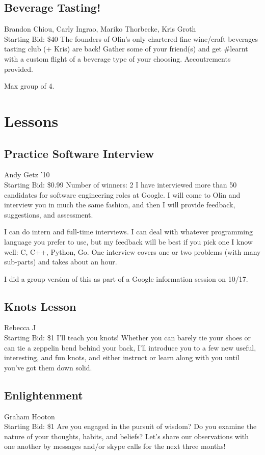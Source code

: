 \documentclass[11pt]{article}
\begin{document}
\subsection{Beverage Tasting!}
Brandon Chiou, Carly Ingrao, Mariko Thorbecke, Kris Groth
\\
Starting Bid: \$40
\newline
The founders of Olin's only chartered fine wine/craft beverages tasting club (+ Kris) are back! Gather some of your friend(s) and get \#learnt with a custom flight of a beverage type of your choosing. Accoutrements provided.

Max group of 4.
\section{Lessons}
\subsection{Practice Software Interview}
Andy Getz '10
\\
Starting Bid: \$0.99
\newline
Number of winners: 2
\newline
I have interviewed more than 50 candidates for software engineering roles at Google.  I will come to Olin and interview you in much the same fashion, and then I will provide feedback, suggestions, and assessment.

I can do intern and full-time interviews.  I can deal with whatever programming language you prefer to use, but my feedback will be best if you pick one I know well: C, C++, Python, Go.  One interview covers one or two problems (with many sub-parts) and takes about an hour.

I did a group version of this as part of a Google information session on 10/17.
\subsection{Knots Lesson}
Rebecca J
\\
Starting Bid: \$1
\newline
I'll teach you knots! Whether you can barely tie your shoes or can tie a zeppelin bend behind your back, I'll introduce you to a few new useful, interesting, and fun knots, and either instruct or learn along with you until you've got them down solid.
\subsection{Enlightenment}
Graham Hooton
\\
Starting Bid: \$1
\newline
Are you engaged in the pursuit of wisdom? Do you examine the nature of your thoughts, habits, and beliefs? Let's share our observations with one another by messages and/or skype calls for the next three months!
\end{document}
